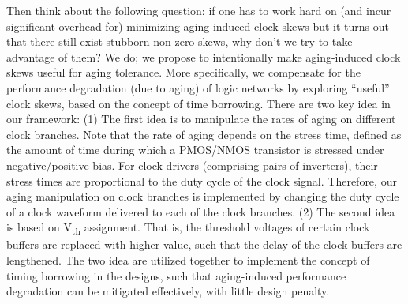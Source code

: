 Then think about the following question: if one has to work hard on (and incur significant overhead for) minimizing aging-induced clock skews but it turns out that there still exist stubborn non-zero skews, why don't we try to take advantage of them? We do; we propose to intentionally make aging-induced clock skews useful for aging tolerance. More specifically, we compensate for the performance degradation (due to aging) of logic networks by exploring \enquote{useful} clock skews, based on the concept of time borrowing. There are two key idea in our framework: (1) The first idea is to manipulate the rates of aging on different clock branches. Note that the rate of aging depends on the stress time, defined as the amount of time during which a PMOS/NMOS transistor is stressed under negative/positive bias. For clock drivers (comprising pairs of inverters), their stress times are proportional to the duty cycle of the clock signal. Therefore, our aging manipulation on clock branches is implemented by changing the duty cycle of a clock waveform delivered to each of the clock branches. (2) The second idea is based on V\textsubscript{th} assignment. That is, the threshold voltages of  certain clock buffers are replaced with higher value, such that the delay of the clock buffers are lengthened. The two idea are utilized together to implement the concept of timing borrowing in the designs, such that aging-induced performance degradation can be mitigated effectively, with little design penalty.
\begin{comment}
Then think about the following question: if one has to work hard on (and incur significant overhead for) minimizing aging-induced clock skews but it turns out that there still exist stubborn non-zero skews, why don't we try to take advantage of them? We do; we propose to intentionally make aging-induced clock skews useful for aging tolerance. More specifically, we compensate for the performance degradation (due to aging) of logic networks by exploring \enquote{useful} aging-induced clock skews, based on the concept of time borrowing. Note that the rate of aging depends on the stress time, defined as the amount of time during which a PMOS/NMOS transistor is stressed under negative/positive bias. For clock drivers (comprising pairs of inverters), their stress times are proportional to the duty cycle of the clock signal. The key idea of our framework is to manipulate the rates of aging on different clock branches, by changing the duty cycle of a clock waveform delivered to each of the clock branches. The proposed framework succeeds in mitigating effective aging-induced performance degradation with little design penalty.
\end{comment}